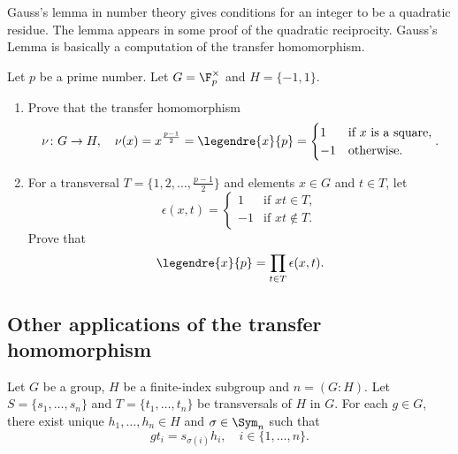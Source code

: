
Gauss's lemma in number theory gives conditions for an integer to be a quadratic residue. The lemma appears in some proof of the quadratic reciprocity. Gauss's Lemma is basically a computation of the transfer homomorphism. 

\begin{exercise}
	Let $p$ be a prime number. Let $G=\F_p^\times$ and $H=\{-1,1\}$. 
    \begin{enumerate} 
    \item Prove that the transfer homomorphism 
	\[
		\nu\colon G\to H,\quad
		\nu(x)=x^{\frac{p-1}{2}}=\legendre{x}{p}=\begin{cases}
			1 & \text{if $x$ is a square},\\
			-1 & \text{otherwise}.
		\end{cases}.
	\]
	\item For a transversal $T=\{1,2,\dots,\frac{p-1}{2}\}$ and elements $x\in G$ and $t\in T$, let 
 	\[
	\epsilon(x,t)=\begin{cases}
		1 & \text{if $xt\in T$},\\
		-1 & \text{if $xt\not\in T$}.
	\end{cases}
	\]
	Prove that  
	\[
	\legendre{x}{p}=\prod_{t\in T}\epsilon(x,t).
	\]
    \end{enumerate}
\end{exercise}

\subsection{Other applications of the transfer homomorphism}

\begin{lemma}
	\label{lem:sigma}
	Let $G$ be a group, $H$ be a finite-index subgroup and $n=(G:H)$. 
    Let $S=\{s_1,\dots,s_n\}$ and $T=\{t_1,\dots,t_n\}$ be transversals of $H$ in $G$. 
    For each $g\in G$, there exist unique $h_1,\dots,h_n\in H$ and 
	$\sigma\in\Sym_n$ such that 
	\[
		gt_i=s_{\sigma(i)}h_i,\quad
		i\in\{1,\dots,n\}.
	\]
\end{lemma}

